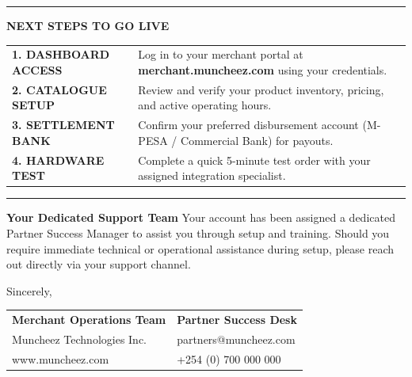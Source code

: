 \documentclass[11pt,a4paper]{article}
\begin{document}
\vspace{0.2cm}

\color{SolidBlack}\hrule height 0.5pt
\vspace{0.25cm}
\textsf{\scriptsize\bfseries\color{LinkBlue}\uppercase{Next Steps to Go Live}} \\[0.2cm]

\begin{tabularx}{\textwidth}{@{} p{3.2cm} !{\color{LinkBlue}\vrule width 1.5pt} X @{}}
    \textsf{\small\bfseries\color{SolidBlack} 1. DASHBOARD ACCESS} & \textsf{\small\color{SolidBlack} Log in to your merchant portal at \textbf{merchant.muncheez.com} using your credentials.} \\[0.15cm]
    \textsf{\small\bfseries\color{SolidBlack} 2. CATALOGUE SETUP} & \textsf{\small\color{SolidBlack} Review and verify your product inventory, pricing, and active operating hours.} \\[0.15cm]
    \textsf{\small\bfseries\color{SolidBlack} 3. SETTLEMENT BANK} & \textsf{\small\color{SolidBlack} Confirm your preferred disbursement account (M-PESA / Commercial Bank) for payouts.} \\[0.15cm]
    \textsf{\small\bfseries\color{SolidBlack} 4. HARDWARE TEST} & \textsf{\small\color{SolidBlack} Complete a quick 5-minute test order with your assigned integration specialist.} \\
\end{tabularx}

\vspace{0.25cm}
\color{SolidBlack}\hrule height 0.5pt
\vspace{0.3cm}

\textsf{\small\bfseries\color{SolidBlack} Your Dedicated Support Team} \newline
\textsf{\small\color{SolidBlack} Your account has been assigned a dedicated Partner Success Manager to assist you through setup and training. Should you require immediate technical or operational assistance during setup, please reach out directly via your support channel.}

\vspace{0.6cm}

Sincerely,

\vspace{0.6cm}

\begin{tabularx}{\textwidth}{@{} X >{\raggedleft\arraybackslash}X @{}}
    \textsf{\small\bfseries\color{SolidBlack} Merchant Operations Team} & \textsf{\small\bfseries\color{SolidBlack} Partner Success Desk} \\
    \textsf{\small\color{SolidBlack} Muncheez Technologies Inc.} & \textsf{\small\color{LinkBlue} partners@muncheez.com} \\
    \textsf{\scriptsize\color{LinkBlue} www.muncheez.com} & \textsf{\small\color{SolidBlack} +254 (0) 700 000 000} \\
\end{tabularx}
\end{document}
